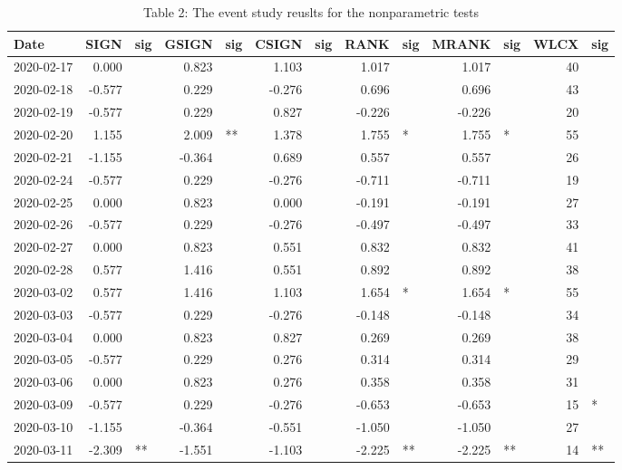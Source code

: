 \documentclass[
]{article}
\begin{document}
\begin{table}

\caption{\label{tab:unnamed-chunk-4}Table 2: The event study reuslts for the nonparametric tests}
\centering
\begin{tabular}[t]{l|r|l|r|l|r|l|r|l|r|l|r|l}
\hline
Date & SIGN & sig & GSIGN & sig & CSIGN & sig & RANK & sig & MRANK & sig & WLCX & sig\\
\hline
2020-02-17 & 0.000 &  & 0.823 &  & 1.103 &  & 1.017 &  & 1.017 &  & 40 & \\
\hline
2020-02-18 & -0.577 &  & 0.229 &  & -0.276 &  & 0.696 &  & 0.696 &  & 43 & \\
\hline
2020-02-19 & -0.577 &  & 0.229 &  & 0.827 &  & -0.226 &  & -0.226 &  & 20 & \\
\hline
2020-02-20 & 1.155 &  & 2.009 & ** & 1.378 &  & 1.755 & * & 1.755 & * & 55 & \\
\hline
2020-02-21 & -1.155 &  & -0.364 &  & 0.689 &  & 0.557 &  & 0.557 &  & 26 & \\
\hline
2020-02-24 & -0.577 &  & 0.229 &  & -0.276 &  & -0.711 &  & -0.711 &  & 19 & \\
\hline
2020-02-25 & 0.000 &  & 0.823 &  & 0.000 &  & -0.191 &  & -0.191 &  & 27 & \\
\hline
2020-02-26 & -0.577 &  & 0.229 &  & -0.276 &  & -0.497 &  & -0.497 &  & 33 & \\
\hline
2020-02-27 & 0.000 &  & 0.823 &  & 0.551 &  & 0.832 &  & 0.832 &  & 41 & \\
\hline
2020-02-28 & 0.577 &  & 1.416 &  & 0.551 &  & 0.892 &  & 0.892 &  & 38 & \\
\hline
2020-03-02 & 0.577 &  & 1.416 &  & 1.103 &  & 1.654 & * & 1.654 & * & 55 & \\
\hline
2020-03-03 & -0.577 &  & 0.229 &  & -0.276 &  & -0.148 &  & -0.148 &  & 34 & \\
\hline
2020-03-04 & 0.000 &  & 0.823 &  & 0.827 &  & 0.269 &  & 0.269 &  & 38 & \\
\hline
2020-03-05 & -0.577 &  & 0.229 &  & 0.276 &  & 0.314 &  & 0.314 &  & 29 & \\
\hline
2020-03-06 & 0.000 &  & 0.823 &  & 0.276 &  & 0.358 &  & 0.358 &  & 31 & \\
\hline
2020-03-09 & -0.577 &  & 0.229 &  & -0.276 &  & -0.653 &  & -0.653 &  & 15 & *\\
\hline
2020-03-10 & -1.155 &  & -0.364 &  & -0.551 &  & -1.050 &  & -1.050 &  & 27 & \\
\hline
2020-03-11 & -2.309 & ** & -1.551 &  & -1.103 &  & -2.225 & ** & -2.225 & ** & 14 & **\\

\end{tabular}
\end{table}
\end{document}
